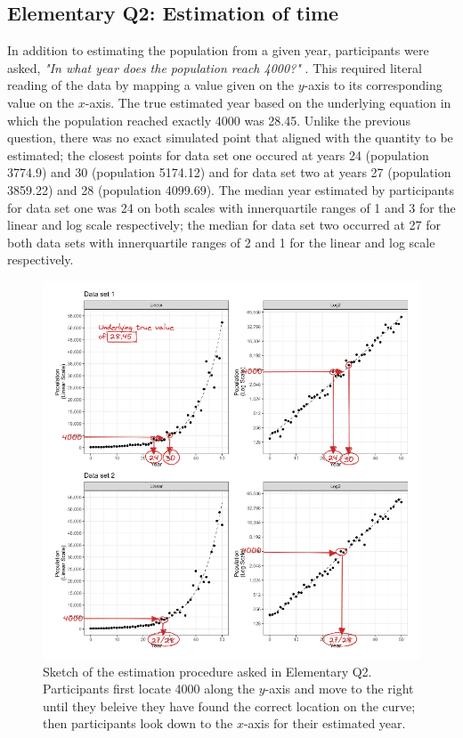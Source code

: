 \documentclass[print]{nuthesis}
\begin{document}
\hypertarget{elementary-q2-estimation-of-time}{%
\subsection{Elementary Q2: Estimation of time}\label{elementary-q2-estimation-of-time}}

In addition to estimating the population from a given year, participants were asked, \textit{"In what year does the population reach 4000?"} .
This required literal reading of the data by mapping a value given on the \(y\)-axis to its corresponding value on the \(x\)-axis.
The true estimated year based on the underlying equation in which the population reached exactly 4000 was 28.45.
Unlike the previous question, there was no exact simulated point that aligned with the quantity to be estimated; the closest points for data set one occured at years 24 (population 3774.9) and 30 (population 5174.12) and for data set two at years 27 (population 3859.22) and 28 (population 4099.69).
The median year estimated by participants for data set one was 24 on both scales with innerquartile ranges of 1 and 3 for the linear and log scale respectively; the median for data set two occurred at 27 for both data sets with innerquartile ranges of 2 and 1 for the linear and log scale respectively.

\begin{figure}[tbp]

{\centering \includegraphics[width=1\linewidth,]{images/03-estimation/qe2-sketch} 

}

\caption[Elementary Q2 sketch]{Sketch of the estimation procedure asked in Elementary Q2. Participants first locate 4000 along the $y$-axis and move to the right until they beleive they have found the correct location on the curve; then participants look down to the $x$-axis for their estimated year.}\label{fig:qe2-sketch}
\end{figure}
\end{document}
